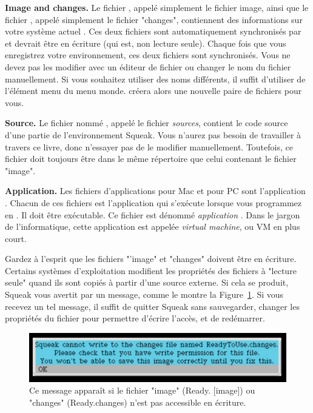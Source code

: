\documentclass[a4paper,10pt,twoside]{book}
\begin{document}
\begin{description}
\item{\textbf{Image and changes.}} Le fichier , appel\'e simplement le fichier image, ainsi que le fichier , appel\'e simplement le fichier "changes", contiennent des informations sur votre syst\`eme actuel \Squeak. Ces deux fichiers sont automatiquement synchronis\'es par \Squeak et devrait \^etre en \'ecriture (qui est, non lecture seule). Chaque fois que vous enregistrez votre environnement, ces deux fichiers sont synchronis\'es. Vous ne devez pas les modifier avec un \'editeur de fichier ou changer le nom du fichier manuellement. Si vous souhaitez utiliser des noms diff\'erents, il suffit d'utiliser  de l'\'el\'ement menu du menu monde. \Squeak cr\'eera alors une nouvelle paire de fichiers pour vous. 

\item{\textbf{Source.}} Le fichier nomm\'e , appel\'e le fichier \emph{sources}, contient le code source d'une partie de l'environnement Squeak. Vous n'aurez pas besoin de travailler \`a travers ce livre, donc n'essayer pas de le modifier manuellement. Toutefois, ce fichier doit toujours \^etre dans le m\^eme r\'epertoire que celui contenant le fichier "image".  

\item{\textbf{Application.}} Les fichiers d'applications  pour Mac et  pour PC sont l'application \Squeak. Chacun de ces fichiers est l'application qui s'ex\'ecute lorsque vous programmez en \Squeak. Il doit \^etre ex\'ecutable. Ce fichier est d\'enomm\'e \emph{application} \Squeak. Dans le jargon de l'informatique, cette application est appel\'ee \emph{virtual machine}, ou VM en plus court.
\end{description}

Gardez \`a l'esprit que les fichiers "'image" et "changes" doivent \^etre en \'ecriture. Certains syst\`emes d'exploitation modifient les propri\'et\'es des fichiers \`a "lecture seule" quand ils sont copi\'es \`a partir d'une source externe. Si cela se produit, Squeak vous avertit par un message, comme le montre la Figure~\ref{fig:readonlyfile}. Si vous recevez un tel message, il suffit de quitter Squeak sans sauvegarder, changer les propri\'et\'es du fichier pour permettre d'\'ecrire l'acc\`es, et de red\'emarrer.

\begin{figure}[!h]\centerline{\includegraphics[width=\linewidth]{17-changesNotWritable}}\caption{Ce message appara\^it si le fichier "image" (Ready. [image]) ou "changes" (Ready.changes) n'est pas accessible en \'ecriture.\label{fig:readonlyfile}}
\end{figure}
\end{document}
